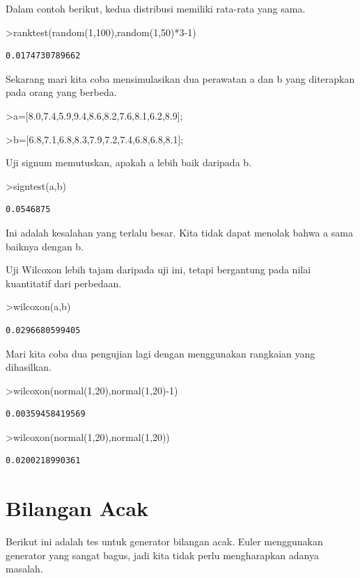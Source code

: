 \documentclass[
]{book}
\begin{document}
Dalam contoh berikut, kedua distribusi memiliki rata-rata yang sama.

\textgreater ranktest(random(1,100),random(1,50)*3-1)

\begin{verbatim}
0.0174730789662
\end{verbatim}

Sekarang mari kita coba mensimulasikan dua perawatan a dan b yang diterapkan pada orang yang berbeda.

\textgreater a={[}8.0,7.4,5.9,9.4,8.6,8.2,7.6,8.1,6.2,8.9{]};

\textgreater b={[}6.8,7.1,6.8,8.3,7.9,7.2,7.4,6.8,6.8,8.1{]};

Uji signum memutuskan, apakah a lebih baik daripada b.

\textgreater signtest(a,b)

\begin{verbatim}
0.0546875
\end{verbatim}

Ini adalah kesalahan yang terlalu besar. Kita tidak dapat menolak bahwa a sama baiknya dengan b.

Uji Wilcoxon lebih tajam daripada uji ini, tetapi bergantung pada nilai kuantitatif dari perbedaan.

\textgreater wilcoxon(a,b)

\begin{verbatim}
0.0296680599405
\end{verbatim}

Mari kita coba dua pengujian lagi dengan menggunakan rangkaian yang dihasilkan.

\textgreater wilcoxon(normal(1,20),normal(1,20)-1)

\begin{verbatim}
0.00359458419569
\end{verbatim}

\textgreater wilcoxon(normal(1,20),normal(1,20))

\begin{verbatim}
0.0200218990361
\end{verbatim}

\chapter{Bilangan Acak}\label{bilangan-acak}

Berikut ini adalah tes untuk generator bilangan acak. Euler menggunakan generator yang sangat bagus, jadi kita tidak perlu mengharapkan adanya masalah.
\end{document}
